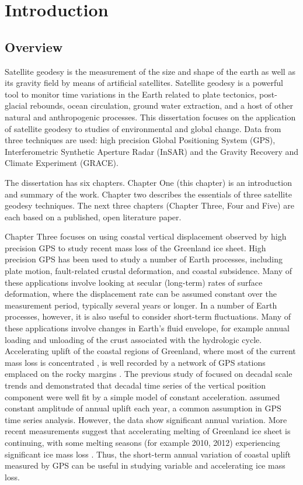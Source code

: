 \chapter{Introduction}
\section{Overview}
Satellite geodesy is the measurement of the size and shape of the earth as well as its gravity field by means of artificial satellites.  Satellite geodesy is a powerful tool to monitor time variations in the Earth related to plate tectonics, post-glacial rebounds, ocean circulation, ground water extraction, and a host of other natural and anthropogenic processes.  This dissertation focuses on the application of satellite geodesy to studies of environmental and global change.  Data from three techniques are used: high precision Global Positioning System (GPS), Interferometric Synthetic Aperture Radar (InSAR) and the Gravity Recovery and Climate Experiment (GRACE).  

The dissertation has six chapters. Chapter One (this chapter) is an introduction and summary of the work.  Chapter two describes the essentials of three satellite geodesy techniques.  The next three chapters (Chapter Three, Four and Five) are each based on a published, open literature paper.  

Chapter Three focuses on using coastal vertical displacement observed by high precision GPS to study recent mass loss of the Greenland ice sheet.  High precision GPS has been used to study a number of Earth processes, including plate motion, fault-related crustal deformation, and coastal subsidence.  Many of these applications involve looking at secular (long-term) rates of surface deformation, where the displacement rate can be assumed constant over the measurement period, typically several years or longer.  In a number of Earth processes, however, it is also useful to consider short-term fluctuations.  Many of these applications involve changes in Earth's fluid envelope, for example annual loading and unloading of the crust associated with the hydrologic cycle.  Accelerating uplift of the coastal regions of Greenland, where most of the current mass loss is concentrated \cite[e.g.,][]{zwally2005intro,thomas2006intro,luthcke2006intro,rignot2006intro,wouters2008intro}, is well recorded by a network of GPS stations emplaced on the rocky margins \cite[]{bevis2012intro}.  The previous study of \citet{jiang2010intro} focused on decadal scale trends and demonstrated that decadal time series of the vertical position component were well fit by a simple model of constant acceleration.  \citet{jiang2010intro} assumed constant amplitude of annual uplift each year, a common assumption in GPS time series analysis. However, the data show significant annual variation.  More recent measurements suggest that accelerating melting of Greenland ice sheet is continuing, with some melting seasons (for example 2010, 2012) experiencing significant ice mass loss \cite[]{bevis2012intro,nghiem2012intro}.  Thus, the short-term annual variation of coastal uplift measured by GPS can be useful in studying variable and accelerating ice mass loss.

